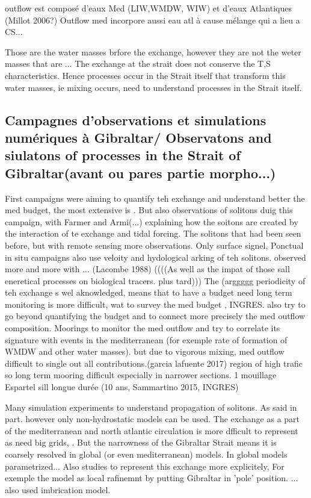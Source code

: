 outflow est composé d’eaux Med (LIW,WMDW, WIW) et d’eaux Atlantiques (Millot 2006?)
Outflow med incorpore aussi eau atl à cause mélange qui a lieu a CS...   

Those are the water masses brfore the exchange, however they are not the weter masses that are ... The exchange at the strait does not conserve the T,S characteristics. Hence processes occur in the Strait itself that transform this water masses, ie mixing occurs, need to understand processes in the Strait itself.

\subsection{Campagnes d'observations et simulations numériques à Gibraltar/ Observatons and siulatons of processes in the Strait of Gibraltar(avant ou pares partie morpho...)}


First campaigns were aiming to quantify teh exchange and understand better the med budget, the most extensive is  . But also observations of solitons duig this campaign, with Farmer and Armi(...) explaining how the soitons are created by the interaction of te exchange and tidal forcing. The solitons that had been seen before, but with remote sensing more observations. Only surface signel, Ponctual in situ campaigns also use veloity and hydological arking of teh solitons. observed more and more with ... (Lacombe 1988) ((((As well as the impat of those sall eneretical processes on biological tracers. plus tard)))
The (arggggg periodicity of teh exchange s wel aknowledged, means that to have a budget need long term monitoring is more difficult, wat to survey the med budget , INGRES. also try to go beyond quantifying the budget and to connect more precisely the med outflow composition.
Moorings to monitor the med outflow and try to correlate its signature with events in the mediterranean (for exemple rate of formation of WMDW and other water masses). but due to vigorous mixing, med outflow difficult to single out all contributions.(garcia lafuente 2017) region of high trafic so long term mooring difficult especially in narrower sections. 1 mouillage Espartel sill longue durée (10 ans, Sammartino 2015, INGRES)

Many simulation experiments to understand propagation of solitons. As said in part. however only non-hydrostatic models can be used. The exchange as a part of the mediterranean and north atlantic circulation is more dfficult to represent as need big grids, . 
But the narrowness of the Gibraltar Strait means it is coarsely resolved in global (or even mediterranean) models. In global models parametrized...
Also studies to represent this exchange more explicitely, For exemple the model as local rafinemnt by putting Gibraltar in 'pole' position. ... also used imbrication model.

